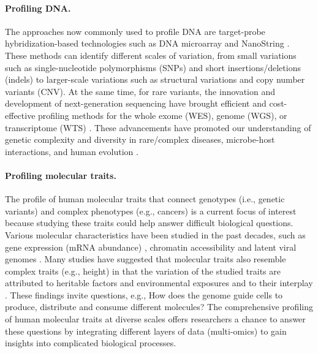 \documentclass{book}
\begin{document}
\begin{refsection}
\paragraph*{Profiling DNA.} The approaches now commonly used to profile DNA are target-probe hybridization-based technologies such as DNA microarray and NanoString \cite{Geiss2008Direct}.
These methods can identify different scales of variation, from small variations such as single-nucleotide polymorphisms (SNPs) and short insertions/deletions (indels) to larger-scale variations such as structural variations and copy number variants (CNV).
At the same time, for rare variants, the innovation and development of next-generation sequencing have brought efficient and cost-effective profiling methods for the whole exome (WES), genome (WGS), or transcriptome (WTS) \cite{Boycott2013Rare,Salk2018Enhancing}.
These advancements have promoted our understanding of genetic complexity and diversity in rare/complex diseases, microbe-host interactions, and human evolution \cite{Veeramah2014The}.

\paragraph*{Profiling molecular traits.} The profile of human molecular traits that connect genotypes (i.e., genetic variants) and complex phenotypes (e.g., cancers) is a current focus of interest because studying these traits could help answer difficult biological questions.
Various molecular characteristics have been studied in the past decades, such as gene expression (mRNA abundance) \cite{Wang2009RNA,Conesa2016A,Murdock2021Transcriptome}, chromatin accessibility \cite{Buenrostro2015ATAC,Yan2020From} and latent viral genomes \cite{Speck2010Viral,Lieberman2016Epigenetics,Maldarelli2014Specific}.
Many studies have suggested that molecular traits also resemble complex traits (e.g., height) in that the variation of the studied traits are attributed to heritable factors and environmental exposures and to their interplay \cite{Shah2014Genetic}.
These findings invite questions, e.g., How does the genome guide cells to produce, distribute and consume different molecules? The comprehensive profiling of human molecular traits at diverse scales offers researchers a chance to answer these questions by integrating different layers of data (multi-omics) to gain insights into complicated biological processes.


\end{refsection}
\end{document}
